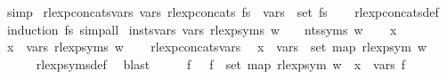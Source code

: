 \begin{isabellebody}
\ simp%
\endisatagproof
{\isafoldproof}%
%
\isadelimproof
\isanewline
%
\endisadelimproof
\isanewline
{}\isamarkupfalse%
\ rlexp{\isacharunderscore}{\kern0pt}concats{\isacharunderscore}{\kern0pt}vars{\isacharcolon}{\kern0pt}\ {\isachardoublequoteopen}vars\ {\isacharparenleft}{\kern0pt}rlexp{\isacharunderscore}{\kern0pt}concats\ fs{\isacharparenright}{\kern0pt}\ {\isacharequal}{\kern0pt}\ {\isasymUnion}{\isacharparenleft}{\kern0pt}vars\ {\isacharbackquote}{\kern0pt}\ set\ fs{\isacharparenright}{\kern0pt}{\isachardoublequoteclose}\isanewline
%
\isadelimproof
\ \ %
\endisadelimproof
%
\isatagproof
{}\isamarkupfalse%
\ rlexp{\isacharunderscore}{\kern0pt}concats{\isacharunderscore}{\kern0pt}def\ \isamarkupfalse%
\ {\isacharparenleft}{\kern0pt}induction\ fs{\isacharparenright}{\kern0pt}\ simp{\isacharunderscore}{\kern0pt}all%
\endisatagproof
{\isafoldproof}%
%
\isadelimproof
\isanewline
%
\endisadelimproof
\isanewline
\isanewline
{}\isamarkupfalse%
\ insts{\isacharprime}{\kern0pt}{\isacharunderscore}{\kern0pt}vars{\isacharcolon}{\kern0pt}\ {\isachardoublequoteopen}vars\ {\isacharparenleft}{\kern0pt}rlexp{\isacharunderscore}{\kern0pt}syms\ w{\isacharparenright}{\kern0pt}\ {\isasymsubseteq}\ {\isasymgamma}{\isacharprime}{\kern0pt}\ {\isacharbackquote}{\kern0pt}\ nts{\isacharunderscore}{\kern0pt}syms\ w{\isachardoublequoteclose}\isanewline
%
\isadelimproof
%
\endisadelimproof
%
\isatagproof
{}\isamarkupfalse%
\isanewline
\ \ \isamarkupfalse%
\ x\isanewline
\ \ \isamarkupfalse%
\ {\isachardoublequoteopen}x\ {\isasymin}\ vars\ {\isacharparenleft}{\kern0pt}rlexp{\isacharunderscore}{\kern0pt}syms\ w{\isacharparenright}{\kern0pt}{\isachardoublequoteclose}\isanewline
\ \ \isamarkupfalse%
\ rlexp{\isacharunderscore}{\kern0pt}concats{\isacharunderscore}{\kern0pt}vars\ \isamarkupfalse%
\ {\isachardoublequoteopen}x\ {\isasymin}\ {\isasymUnion}{\isacharparenleft}{\kern0pt}vars\ {\isacharbackquote}{\kern0pt}\ set\ {\isacharparenleft}{\kern0pt}map\ rlexp{\isacharunderscore}{\kern0pt}sym\ w{\isacharparenright}{\kern0pt}{\isacharparenright}{\kern0pt}{\isachardoublequoteclose}\isanewline
\ \ \ \ \isamarkupfalse%
\ rlexp{\isacharunderscore}{\kern0pt}syms{\isacharunderscore}{\kern0pt}def\ \isamarkupfalse%
\ blast\isanewline
\ \ \isamarkupfalse%
\ \isamarkupfalse%
\ f\ \ {\isacharasterisk}{\kern0pt}{\isacharcolon}{\kern0pt}\ {\isachardoublequoteopen}f\ {\isasymin}\ set\ {\isacharparenleft}{\kern0pt}map\ rlexp{\isacharunderscore}{\kern0pt}sym\ w{\isacharparenright}{\kern0pt}\ {\isasymand}\ x\ {\isasymin}\ vars\ f{\isachardoublequoteclose}\ \isamarkupfalse%

\end{isabellebody}

